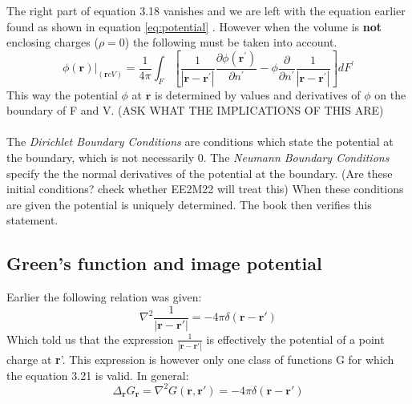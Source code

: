 The right part of equation 3.18 vanishes and we are left with the equation earlier found as shown in equation \ref{eq:potential} .
However when the volume is \textbf{not} enclosing charges ($\rho = 0$) the following must be taken into account.
\begin{equation}
    \left.\phi(\mathbf{r})\right|_{(\mathbf{r} c V)}=\frac{1}{4 \pi} \int_{F}\left[\frac{1}{\left|\mathbf{r}-\mathbf{r}^{\prime}\right|} \frac{\partial \phi\left(\mathbf{r}^{\prime}\right)}{\partial n^{\prime}}-\phi \frac{\partial}{\partial n^{\prime}} \frac{1}{\left|\mathbf{r}-\mathbf{r}^{\prime}\right|}\right] d F^{\prime}
\end{equation}
This way the potential $\phi$ at $\textbf{r}$ is determined by values and derivatives of $\phi$ on the boundary of F and V. (ASK WHAT THE IMPLICATIONS OF THIS ARE)\\\
\\
\noindent The \textit{Dirichlet Boundary Conditions} are conditions which state the potential at the boundary, which is not necessarily 0. 
The \textit{Neumann Boundary Conditions} specify the the normal derivatives of the potential at the boundary. (Are these initial conditions? check whether EE2M22 will treat this)
When these conditions are given the potential is uniquely determined. The book then verifies this statement. 
\subsection{Green's function and image potential}
Earlier the following relation was given:
\begin{equation}
    \nabla^2 \frac{1}{|\textbf{r}-\textbf{r}'|} = -4\pi \delta(\textbf{r}-\textbf{r}')
\end{equation}
Which told us that the expression $\displaystyle \frac{1}{|\textbf{r}-\textbf{r}'|}$ is effectively the potential of a point charge at \textbf{r}'.
This expression is however only one class of functions G for which the equation 3.21 is valid. In general:
\begin{equation}
    \Delta_{\textbf{r}} G_{\textbf{r}} = \nabla ^2 G(\textbf{r},\textbf{r}') = -4\pi \delta(\textbf{r}- \textbf{r}')
\end{equation}

